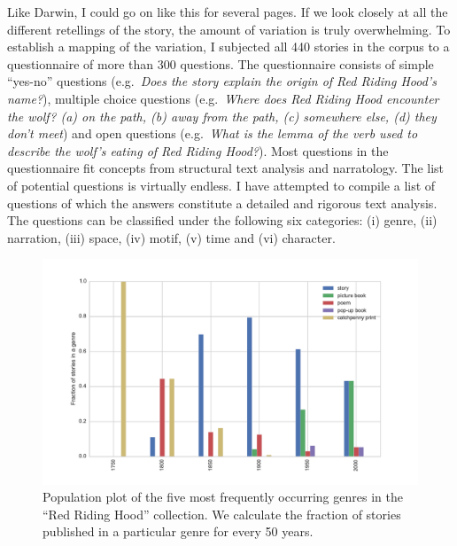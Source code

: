 Like Darwin, I could go on like this for several pages. If we look closely at all the different retellings of the story, the amount of variation is truly overwhelming. To establish a mapping of the variation, I subjected all 440 stories in the corpus to a questionnaire of more than 300 questions. The questionnaire consists of simple ``yes-no'' questions (e.g.\ \emph{Does the story explain the origin of Red Riding Hood's name?}), multiple choice questions (e.g.\ \emph{Where does Red Riding Hood encounter the wolf? (a) on the path, (b) away from the path, (c) somewhere else, (d) they don't meet}) and open questions (e.g.\ \emph{What is the lemma of the verb used to describe the wolf's eating of Red Riding Hood?}). Most questions in the questionnaire fit concepts from structural text analysis and narratology\autocite[E.g.][]{bal:2009,vanboven:2003}. The list of potential questions is virtually endless. I have attempted to compile a list of questions of which the answers constitute a detailed and rigorous text analysis. The questions can be classified under the following six categories: (i) genre, (ii) narration, (iii) space, (iv) motif, (v) time and (vi) character. 

\begin{figure}
    \centering
    \includegraphics[width=\textwidth]{images/genre}
    \caption{Population plot of the five most frequently occurring genres in the ``Red Riding Hood'' collection. We calculate the fraction of stories published in a particular genre for every 50 years.}
    \label{fig:genre}
\end{figure}

